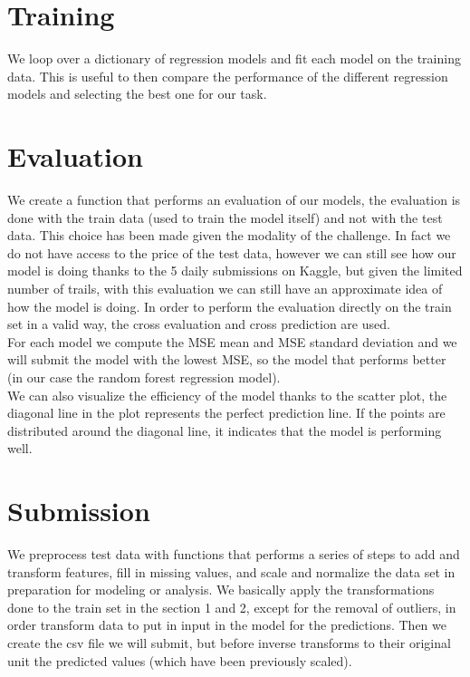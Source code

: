 \documentclass[10pt, notitlepage]{article}
\begin{document}
\color{blue}
\section{Training}
\color{black}
We loop over a dictionary of regression models and fit each model on the training data. This is useful to then compare the performance of the different regression models and selecting the best one for our task.

\color{blue}
\section{Evaluation}
\color{black}
We create a function that performs an evaluation of our models, the evaluation is done with the train data (used to train the model itself) and not with the test data. This choice has been made given the modality of the challenge. In fact we do not have access to the price of the test data, however we can still see how our model is doing thanks to the 5 daily submissions on Kaggle, but given the limited number of trails, with this evaluation we can still have an approximate idea of how the model is doing. In order to perform the evaluation directly on the train set in a valid way, the cross evaluation and cross prediction are used.
\\
For each model we compute the MSE mean and MSE standard deviation and we will submit the model with the lowest MSE, so the model that performs better (in our case the random forest regression model). 
\\
We can also visualize the efficiency of the model thanks to the scatter plot, the diagonal line in the plot represents the perfect prediction line. If the points are distributed around the diagonal line, it indicates that the model is performing well.

\color{blue}
\section{Submission}
\color{black}
We preprocess test data with functions that performs a series of steps to add and transform features, fill in missing values, and scale and normalize the data set in preparation for modeling or analysis. We basically apply the transformations done to the train set in the section 1 and 2, except for the removal of outliers, in order transform data to put in input in the model for the predictions. Then we create the csv file we will submit, but before inverse transforms to their original unit the predicted values (which have been previously scaled).
\end{document}
